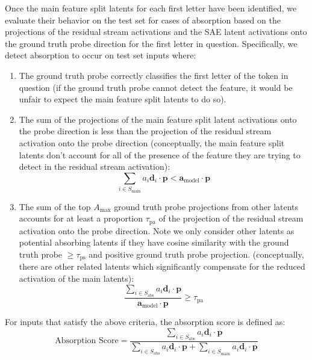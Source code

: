 \documentclass{article}
\theoremstyle{plain}
\theoremstyle{definition}
\theoremstyle{remark}
\begin{document}
Once the main feature split latents for each first letter have been identified, we evaluate their behavior on the test set for cases of absorption based on the projections of the residual stream activations and the SAE latent activations onto the ground truth probe direction for the first letter in question. Specifically, we detect absorption to occur on test set inputs where:
\begin{enumerate}
    \item The ground truth probe correctly classifies the first letter of the token in question (if the ground truth probe cannot detect the feature, it would be unfair to expect the main feature split latents to do so).
    \item The sum of the projections of the main feature split latent activations onto the probe direction is less than the projection of the residual stream activation onto the probe direction (conceptually, the main feature split latents don't account for all of the presence of the feature they are trying to detect in the residual stream activation):\[\sum_{i \in S_\text{main}} a_i \mathbf{d}_i \cdot \mathbf{p} < \mathbf{a}_\text{model} \cdot \mathbf{p}\]
    \item The sum of the top $A_{\max}$ ground truth probe projections from other latents accounts for at least a proportion $\tau_{\text{pa}}$ of the projection of the residual stream activation onto the probe direction. Note we only consider other latents as potential absorbing latents if they have cosine similarity with the ground truth probe $\geq \tau_{\text{ps}}$ and positive ground truth probe projection. (conceptually, there are other related latents which significantly compensate for the reduced activation of the main latents): \[\frac{\sum_{i \in S_\text{abs}} a_i \mathbf{d}_i \cdot \mathbf{p}}{\mathbf{a}_\text{model} \cdot \mathbf{p}} \ge \tau_{\text{pa}}\]
\end{enumerate}

For inputs that satisfy the above criteria, the absorption score is defined as:
\[
\text{Absorption Score} = \frac{\sum_{i \in S_\text{abs}} a_i \mathbf{d}_i \cdot \mathbf{p}}{\sum_{i \in S_\text{abs}} a_i \mathbf{d}_i \cdot \mathbf{p} + \sum_{i \in S_\text{main}} a_i \mathbf{d}_i \cdot \mathbf{p}}
\]
\end{document}
